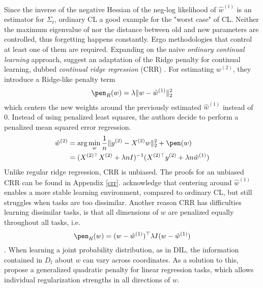 Since the inverse of the negative Hessian of the neg-log likelihood of $\hat{w}^{(t)}$ is an estimator for $\Sigma_t$, ordinary CL a good example for the "worst case" of CL. Neither the maximum eigenvalue of nor the distance between old and new parameters are controlled, thus forgetting happens constantly. Ergo methodologies that control at least one of them are required.
Expanding on the naive \textit{ordinary continual learning} approach, \citeauthor{li2024fixeddesignanalysisregularizationbased} \cite{li2024fixeddesignanalysisregularizationbased} suggest an adaptation of the Ridge penalty for continual learning, dubbed \textit{continual ridge regression} (CRR) \cite{li2024fixeddesignanalysisregularizationbased, zhao2024statisticaltheoryregularizationbasedcontinual}. For estimating $w^{(2)}$, they introduce a Ridge-like penalty term
\begin{equation}\label{ridge}
	\pen_{R}(w) = \lambda\lVert w - \hat{w}^{(1)}\rVert_2^2
\end{equation}
which centers the new weights around the previously estimated $\hat{w}^{(1)}$ instead of 0. Instead of using penalized least squares, the authors decide to perform a penalized mean squared error regression. %
\begin{equation}
	\begin{split}
		\hat{w}^{(2)} &= \arg\min_{w} \frac{1}{n}\lVert y^{(2)} - X^{(2)}w\rVert_2^2 + \pen(w) \\
		&= (X^{(2)\top} X^{(2)}+\lambda n I)^{-1}(X^{(2)\top} y^{(2)} +\lambda n \hat{w}^{(1)})
	\end{split}
\end{equation}
Unlike regular ridge regression, CRR is unbiased. The proofs for an unbiased CRR can be found in Appendix \ref{crr}. \citeauthor{li2024fixeddesignanalysisregularizationbased} acknowledge that centering around $\hat{w}^{(1)}$ enables a more stable learning environment, compared to ordinary CL, but still struggles when tasks are too dissimilar. Another reason CRR has difficulties learning dissimilar tasks, is that all dimensions of $w$ are penalized equally throughout all tasks, i.e.
\begin{equation}\label{ridgeMat}
	\pen_R(w) = (w - \hat{w}^{(1)})^\top \lambda I (w - \hat{w}^{(1)})
\end{equation} . When learning a joint probability distribution, as in DIL, the information contained in $D_t$ about $w$ can vary across coordinates.
As a solution to this, \citeauthor{zhao2024statisticaltheoryregularizationbasedcontinual} \cite{zhao2024statisticaltheoryregularizationbasedcontinual} propose a generalized quadratic penalty for linear regression tasks, which allows individual regularization strengths in all directions of $w$. 

